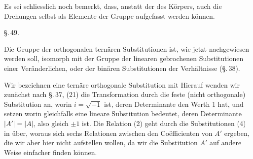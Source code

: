 
Es sei schliesslich noch bemerkt, dass, anstatt der  des
Körpers, auch die Drehungen selbst als Elemente der Gruppe
aufgefasst werden können.

\begin{center}
\S.\,49.

\end{center}

Die Gruppe der orthogonalen ternären Substitutionen ist, wie
jetzt nachgewiesen werden soll, isomorph mit der Gruppe der
linearen gebrochenen Substitutionen einer Veränderlichen, oder der
binären Substitutionen der Verhältnisse (\S.\,38).

Wir bezeichnen
eine ternäre orthogonale Substitution mit
Hierauf wenden wir zunächst nach \S.\,37, (21) die
Transformation durch die feste (nicht orthogonale) Substitution
an, worin $i = \sqrt{-1}$ ist, deren Determinante den Werth 1 hat,
und setzen
worin
gleichfalls eine lineare Substitution bedeutet, deren
Determinante $|A'| = |A|$, also gleich $\pm 1$ ist. Die Relation
(2) geht durch die Substitutionen (4) in
über, woraus sich sechs Relationen zwischen den Co\"efficienten
von $A'$ ergeben, die wir aber hier nicht aufstellen wollen, da
wir die Substitution $A'$ auf andere Weise einfacher finden
können.
